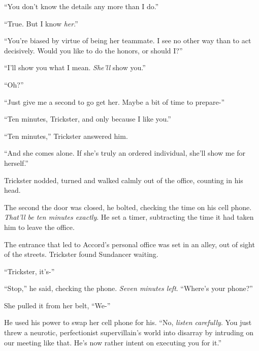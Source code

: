 ``You don't know the details any more than I do.''



``True.  But I know \emph{her}.''



``You're biased by virtue of being her teammate.  I see no other way than to act decisively.  Would you like to do the honors, or should I?''



``I'll show you what I mean.  \emph{She'll} show you.''



``Oh?''



``Just give me a second to go get her.  Maybe a bit of time to prepare-''



``Ten minutes, Trickster, and only because I like you.''



``Ten minutes,'' Trickster answered him.



``And she comes alone.  If she's truly an ordered individual, she'll show me for herself.''



Trickster nodded, turned and walked calmly out of the office, counting in his head.



The second the door was closed, he bolted, checking the time on his cell phone.  \emph{That'll be ten minutes exactly}.  He set a timer, subtracting the time it had taken him to leave the office.



The entrance that led to Accord's personal office was set in an alley, out of sight of the streets.  Trickster found Sundancer waiting.



``Trickster, it's-''



``Stop,'' he said, checking the phone.  \emph{Seven minutes left}.  ``Where's your phone?''



She pulled it from her belt, ``We-''



He used his power to swap her cell phone for his.  ``No, \emph{listen carefully}.  You just threw a neurotic, perfectionist supervillain's world into disarray by intruding on our meeting like that.  He's now rather intent on executing you for it.''



